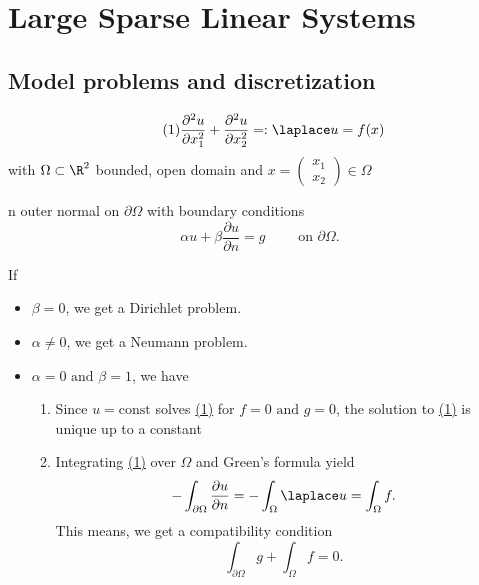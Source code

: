 
\chapter{Large Sparse Linear Systems}
\section{Model problems and discretization}%
\label{sec:Modelproblems and discretization}


\begin{equation}\label{eq:eq_1}\tag{1}
	\frac{\partial^2 u}{\partial x_1^2} + \frac{\partial^2 u}{\partial x_2^2} =: \laplace u = f(x) 
\end{equation}
with $\Omega \subset \R^2$ bounded, open domain and 
$ x =
\begin{pmatrix}
x_1 \\
x_2
\end{pmatrix}
\in \Omega$

n outer normal on $\partial \Omega$
with boundary conditions
\[
\alpha u + \beta \frac{\partial u}{\partial n} = g \qquad \text{ on } \partial \Omega
.\] 

If \begin{itemize}
	\item $ \beta = 0$, we get a Dirichlet problem.
	\item $ \alpha \neq 0$, we get a Neumann problem.
	\item $\alpha = 0 \text{ and } \beta = 1$, we have
		\begin{enumerate}
			\item Since $u = \text{const}$ solves \href{eq:eq_1}{(1)} %
				for $f=0 \text{ and } g = 0$, the solution to \href{eq:eq_1}{(1)} is unique up to a constant
			\item Integrating \href{eq:eq_1}{(1)} over $\Omega$ and Green's formula yield
				\[
				- \int_{\partial\Omega} \frac{\partial u}{\partial n} = - \int_{\Omega} \laplace u = \int_{\Omega} f
				.\] 
				This means, we get a compatibility condition
				\[
				\int_{\partial \Omega} g + \int_{\Omega}f = 0
				.\] 
		\end{enumerate}
\end{itemize} 

